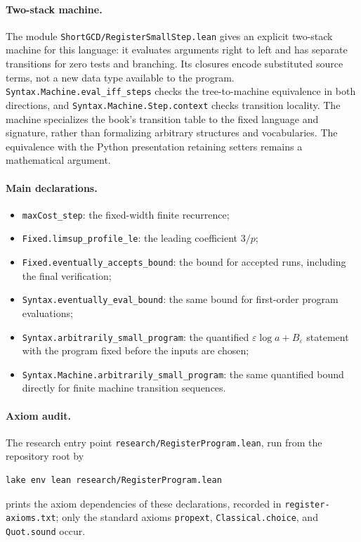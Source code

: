 \documentclass[11pt]{article}
\newcommand{\lean}[1]{\nolinkurl{#1}}
\begin{document}
\paragraph{Two-stack machine.}
The module \texttt{ShortGCD/RegisterSmallStep.lean} gives an explicit
two-stack machine for this language: it evaluates arguments right to left and
has separate transitions for zero tests and branching. Its closures encode
substituted source terms, not a new data type available to the program.
\lean{Syntax.Machine.eval_iff_steps} checks the tree-to-machine equivalence in
both directions, and \lean{Syntax.Machine.Step.context} checks transition
locality. The machine specializes the book's transition table to the fixed
language and signature, rather than formalizing arbitrary structures and
vocabularies. The equivalence with the Python presentation retaining setters
remains a mathematical argument.

\paragraph{Main declarations.}
\begin{itemize}
\item \lean{maxCost_step}: the fixed-width finite recurrence;
\item \lean{Fixed.limsup_profile_le}: the leading coefficient $3/p$;
\item \lean{Fixed.eventually_accepts_bound}: the bound for accepted runs,
including the final verification;
\item \lean{Syntax.eventually_eval_bound}: the same bound for first-order
program evaluations;
\item \lean{Syntax.arbitrarily_small_program}: the quantified
$\varepsilon\log a+B_\varepsilon$ statement with the program fixed before
the inputs are chosen;
\item \lean{Syntax.Machine.arbitrarily_small_program}: the same quantified
bound directly for finite machine transition sequences.
\end{itemize}

\paragraph{Axiom audit.}
The research entry point \texttt{research/RegisterProgram.lean}, run from the
repository root by
\begin{verbatim}
lake env lean research/RegisterProgram.lean
\end{verbatim}
prints the axiom dependencies of these declarations, recorded in
\texttt{register-axioms.txt}; only the standard axioms \lean{propext},
\lean{Classical.choice}, and \lean{Quot.sound} occur.
\end{document}
